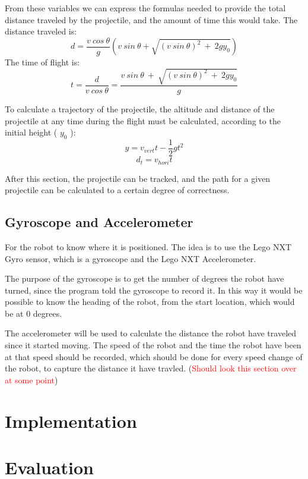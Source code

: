 From these variables we can express the formulas needed to provide the total distance traveled by the projectile, and the amount of time this would take.\newline
The distance traveled is:
\[d = \dfrac{v \ cos \ \theta}{g}(v \ sin \ \theta + \sqrt{(v \ sin \ \theta)^2 \ + \ 2gy_{0}})\] \newline
The time of flight is:
\[t = \dfrac{d}{v \ cos \ \theta} = \dfrac{v \ sin \ \theta \ + \ \sqrt{(v \ sin \ \theta)^2 \ + \ 2gy_{0}}}{g}\]
\newline

To calculate a trajectory of the projectile, the altitude and distance of the projectile at any time during the flight must be calculated, according to the initial height ( \(y_{0}\) ):
\[y = v_{vert}t - \dfrac{1}{2} gt^2\]
\[d_{t} = v_{hori}t\]

After this section, the projectile can be tracked, and the path for a given projectile can be calculated to a certain degree of correctness. 

\subsection{Gyroscope and Accelerometer}
\label{sec:i1Gyroscope and Accelerometer}
For the robot to know where it is positioned. The idea is to use the Lego NXT Gyro sensor, which is a gyroscope and the Lego NXT Accelerometer. 

The purpose of the gyroscope is to get the number of degrees the robot have turned, since the program told the gyroscope to record it. In this way it would be possible to know the heading of the robot, from the start location, which would be at 0 degrees. 

The accelerometer will be used to calculate the distance the robot have traveled since it started moving. The speed of the robot and the time the robot have been at that speed should be recorded, which should be done for every speed change of the robot, to capture the distance it have travled.
(\textcolor{red}{Should look this section over at some point})

\section{Implementation}
\label{sec:i1Implementation}

\section{Evaluation}
\label{sec:i1Evaluation}

